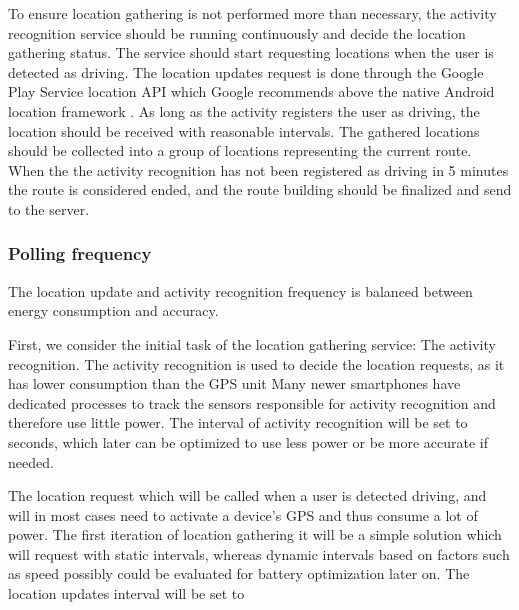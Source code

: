 To ensure location gathering is not performed more than necessary, the activity recognition service should be running continuously and decide the location gathering status.
The service should start requesting locations when the user is detected as driving. 
The location updates request is done through the Google Play Service location API which Google recommends above the native Android location framework \cite{apploc}.
As long as the activity registers the user as driving, the location should be received with reasonable intervals.
The gathered locations should be collected into a group of locations representing the current route.
When the the activity recognition has not been registered as driving in 5 minutes the route is considered ended, and the route building should be finalized and send to the server.

\subsubsection{Polling frequency}
The location update and activity recognition frequency is balanced between energy consumption and accuracy.

First, we consider the initial task of the location gathering service: The activity recognition.
The activity recognition is used to decide the location requests, as it has lower consumption than the GPS unit \DIFdelbegin {}%
\DIFdelend \DIFaddbegin {}\DIFaddend Many newer smartphones \DIFdelbegin %
\DIFdelend \DIFaddbegin {}\DIFaddend have dedicated processes to track the sensors responsible for activity recognition and therefore use little power.
The interval of activity recognition will be set to \DIFdelbegin {}\DIFdelend \DIFaddbegin {}\DIFaddend seconds, which later can be optimized to use less power or be more accurate if needed.

The location request which will be called when a user is detected driving, and will in most cases need to activate a device's GPS and thus consume a lot of power.
The first iteration of location gathering it will be a simple solution which will request with static intervals, whereas dynamic intervals based on factors such as speed possibly could be evaluated for battery optimization later on.
The location updates interval will be set to \DIFdelbegin {}\DIFdelend \DIFaddbegin {}\DIFaddend 

